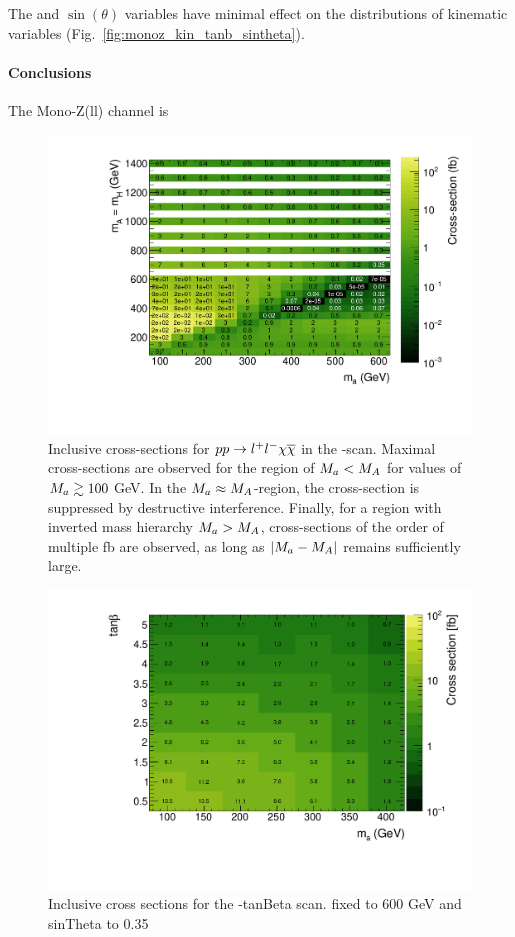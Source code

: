 The \tanb and $\sin(\theta)$ variables have minimal effect on the distributions of kinematic variables (Fig.~\ref{fig:monoz_kin_tanb_sintheta}).

\paragraph{Conclusions} The Mono-Z(ll) channel is 

\begin{figure}
\centering
\includegraphics[width=\textwidth]{texinputs/04_grid/figures/monoz/leptonic/xs_2d_inclusive_26300.pdf}
\caption{Inclusive cross-sections for $pp\rightarrow l^{+}l^{-}\chi\overline{\chi}$ in the \ma-\mA scan. Maximal cross-sections are observed for the region of $M_{a} < M_{A}$ for values of $M_{a}\gtrsim100$ GeV.  In the $M_{a}\approx M_{A}$-region, the cross-section is suppressed by destructive interference. Finally, for a region with inverted mass hierarchy $M_{a}>M_{A}$, cross-sections of the order of multiple fb are observed, as long as $|M_{a}-M_{A}|$ remains sufficiently large.}
\end{figure}


\begin{figure}
\centering
\includegraphics[width=\textwidth]{texinputs/04_grid/figures/monoz/leptonic/tanbma_xsec_ll.pdf}
\caption{Inclusive cross sections for the \ma-tanBeta scan.  \mA fixed to 600 GeV and sinTheta to 0.35} 
\end{figure}

